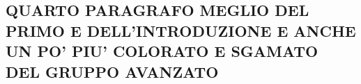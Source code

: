 \subsection{QUARTO PARAGRAFO MEGLIO DEL PRIMO E DELL'INTRODUZIONE E ANCHE UN PO' PIU' COLORATO E SGAMATO DEL GRUPPO AVANZATO}
